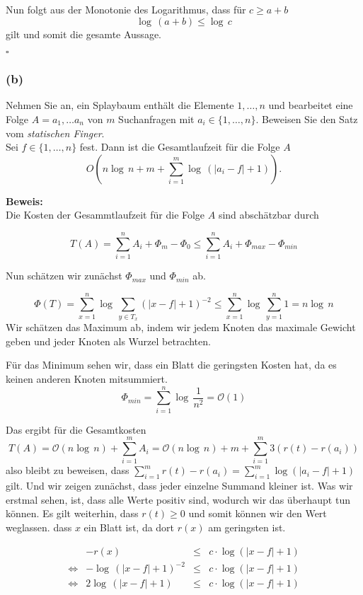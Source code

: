 \documentclass[11pt,a4paper,ngerman]{article}
\begin{document}
Nun folgt aus der Monotonie des Logarithmus, dass für $c \geq a+b$
$$
   \log \, (a+b) \leq \log \, c
$$
gilt und somit die gesamte Aussage.

\mbox{}\hfill$\square$

\subsubsection*{(b)}

Nehmen Sie an, ein Splaybaum enthält die Elemente $1, \ldots, n$ und bearbeitet eine Folge $A = a_1, \ldots a_n$ von $m$ Suchanfragen mit $a_i\in\{1,\ldots,n\}$. Beweisen Sie den Satz vom \emph{statischen Finger}.\\

Sei $f\in\{1,\ldots,n\}$ fest. Dann ist die Gesamtlaufzeit für die Folge $A$
$$
   O(n \log \, n + m + \sum_{i=1}^m \log \, (|a_i - f| + 1)).
$$

\noindent\textbf{Beweis:}\\

Die Kosten der Gesammtlaufzeit für die Folge $A$ sind abschätzbar durch

$$
	T(A) = \sum_{i=1}^n A_i + \Phi_m - \Phi_0 \leq \sum_{i=1}^n A_i + \Phi_{max} - \Phi_{min}
$$

Nun schätzen wir zunächst $\Phi_{max}$ und $\Phi_{min}$ ab. 

$$
	\Phi(T) = \sum_{x=1}^n \log \, \sum_{y \in T_x} \left(|x - f| + 1\right)^{-2} \leq \sum_{x=1}^n \log \, \sum_{y=1}^n 1 = n \log \, n
$$
Wir schätzen das Maximum ab, indem wir jedem Knoten das maximale Gewicht geben und jeder Knoten als Wurzel betrachten.

Für das Minimum sehen wir, dass ein Blatt die geringsten Kosten hat, da es keinen anderen Knoten mitsummiert.
$$
	\Phi_{min} = \sum_{i=1}^n \log \, \frac{1}{n^2} = \mathcal{O}(1)
$$

Das ergibt für die Gesamtkosten
$$
	T(A) = \mathcal{O}(n \log \, n) + \sum_{i=1}^m A_i = \mathcal{O}(n \log \, n) + m + \sum_{i=1}^m 3(r(t) - r(a_i))
$$
also bleibt zu beweisen, dass $\sum_{i=1}^m r(t) - r(a_i) = \sum_{i=1}^m \log (|a_i - f| + 1)$ gilt. Und wir zeigen
zunächst, dass jeder einzelne Summand kleiner ist. Was wir erstmal sehen, ist, dass alle Werte positiv sind, wodurch
wir das überhaupt tun können. Es gilt weiterhin, dass $r(t) \geq 0$ und somit können wir den Wert weglassen.
dass $x$ ein Blatt ist, da dort $r(x)$ am geringsten ist.

$$\begin{array}{crcl}
	&  - r(x) &\leq& c \cdot \log (|x - f| + 1)\\ 
\Leftrightarrow & - \log \, (|x - f| + 1)^{-2} & \leq & c \cdot \log (|x - f|+ 1)\\
\Leftrightarrow & 2 \log \, (|x - f| + 1) & \leq & c \cdot \log (|x - f| + 1)
\end{array}$$
\end{document}
